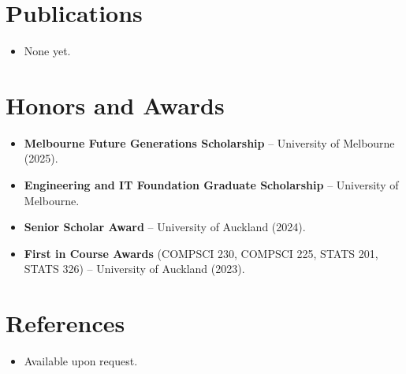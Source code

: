 \documentclass[11pt,a4paper,sans]{moderncv}
\begin{document}

\section{Publications}
\vspace{1pt}
\begin{itemize}
\item None yet.
\end{itemize}


\section{Honors and Awards}
\vspace{1pt}
\begin{itemize}
\item{\textbf{Melbourne Future Generations Scholarship} -- University of Melbourne (2025).}
\item{\textbf{Engineering and IT Foundation Graduate Scholarship} -- University of Melbourne.}
\item{\textbf{Senior Scholar Award} -- University of Auckland (2024).}
\item{\textbf{First in Course Awards} (COMPSCI 230, COMPSCI 225, STATS 201, STATS 326) -- University of Auckland (2023).}
\end{itemize}


\section{References}
\vspace{1pt}
\begin{itemize}
\item{Available upon request.}
\end{itemize}
\end{document}
